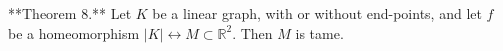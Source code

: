 **Theorem 8.** Let $K$ be a linear graph, with or without end-points, and let $f$ be a homeomorphism $|K| \leftrightarrow M \subset \mathbb{R}^2$. Then $M$ is tame.
